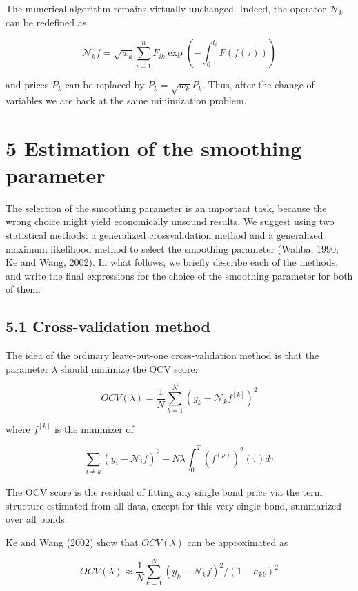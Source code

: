 \documentclass[10pt]{article}
\begin{document}
The numerical algorithm remains virtually unchanged. Indeed, the operator $\mathcal{N}_{k}$ can be redefined as

$$
\mathcal{N}_{k} f=\sqrt{w_{k}} \sum_{i=1}^{n} F_{i k} \exp \left(-\int_{0}^{t_{i}} F(f(\tau))\right)
$$

and prices $P_{k}$ can be replaced by $P_{k}^{\prime}=\sqrt{w_{k}} P_{k}$. Thus, after the change of variables we are back at the same minimization problem.

\section*{5 Estimation of the smoothing parameter}
The selection of the smoothing parameter is an important task, because the wrong choice might yield economically unsound results. We suggest using two statistical methods: a generalized crossvalidation method and a generalized maximum likelihood method to select the smoothing parameter (Wahba, 1990; Ke and Wang, 2002). In what follows, we briefly describe each of the methods, and write the final expressions for the choice of the smoothing parameter for both of them.

\subsection*{5.1 Cross-validation method}
The idea of the ordinary leave-out-one cross-validation method is that the parameter $\lambda$ should minimize the OCV score:


\begin{equation*}
O C V(\lambda)=\frac{1}{N} \sum_{k=1}^{N}\left(y_{k}-\mathcal{N}_{k} f^{[k]}\right)^{2} \tag{39}
\end{equation*}


where $f^{[k]}$ is the minimizer of


\begin{equation*}
\sum_{i \neq k}\left(y_{i}-\mathcal{N}_{i} f\right)^{2}+N \lambda \int_{0}^{T}\left(f^{(p)}\right)^{2}(\tau) d \tau \tag{40}
\end{equation*}


The OCV score is the residual of fitting any single bond price via the term structure estimated from all data, except for this very single bond, summarized over all bonds.

Ke and Wang (2002) show that $O C V(\lambda)$ can be approximated as


\begin{equation*}
O C V(\lambda) \approx \frac{1}{N} \sum_{k=1}^{N}\left(y_{k}-\mathcal{N}_{k} f\right)^{2} /\left(1-a_{k k}\right)^{2} \tag{41}
\end{equation*}
\end{document}
